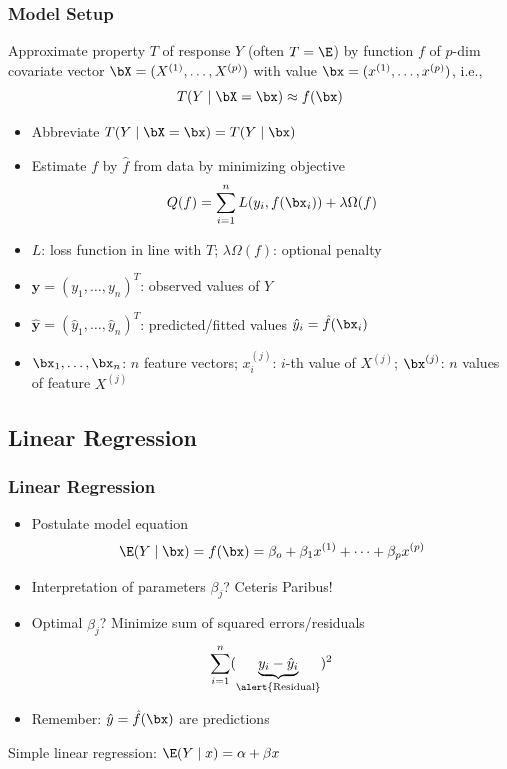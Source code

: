 \begin{frame}
	\frametitle{Model Setup}
	Approximate property $T$ of \alert{response} $Y$ (often $T = \E$) by function $f$ of $p$-dim \alert{covariate} vector $\bX = (X^{(1)}, \dots, X^{(p)})$ with value $\bx = (x^{(1)}, \dots, x^{(p)})$, i.e.,
	$$
		T(Y\mid \bX = \bx) \approx f(\bx)
	$$
	\vspace{-1.5em}
	\begin{itemize}
		\item Abbreviate $T(Y\mid \bX = \bx) = T(Y\mid \bx)$
		\item Estimate $f$ by $\hat f$ from data by minimizing objective
		$$
		Q(f) = \sum_{i = 1}^n L(y_i, f(\bx_i)) + \lambda \Omega(f)
		$$
		\item $L$: loss function in line with $T$; $\lambda \Omega(f)$: optional penalty
		\item $\boldsymbol y = (y_1, \dots, y_n)^T$: observed values of $Y$
		\item $\boldsymbol{\hat y} = (\hat y_1, \dots, \hat y_n)^T$: predicted/fitted values $\hat y_i = \hat f(\bx_i)$
		\item $\bx_1, \dots, \bx_n$: $n$ feature vectors; $x_i^{(j)}$: $i$-th value of $X^{(j)}$; $\bx^{(j)}$: $n$ values of feature $X^{(j)}$
	\end{itemize}
\end{frame}

\subsection{Linear Regression}

\begin{frame}
	\frametitle{Linear Regression}
	\begin{itemize}
		\item Postulate model equation
		$$
		\E(Y \mid \bx) = f(\bx) = \beta_o + \beta_1 x^{(1)} + \dots + \beta_p x^{(p)}
		$$
		\item Interpretation of parameters $\beta_j$? Ceteris Paribus!
		\item Optimal $\hat \beta_j$? Minimize sum of squared errors/residuals
		$$
		\sum_{i = 1}^n (\underbrace{y_i - \hat y_i}_{\text{\alert{Residual}}})^2 
		$$
		\item Remember: $\hat y = \hat f(\bx)$ are \alert{predictions}
	\end{itemize}
	
	\vfill
	
	\begin{example}
		Simple linear regression: $\E(Y \mid x) = \alpha + \beta x$
	\end{example}
\end{frame}

